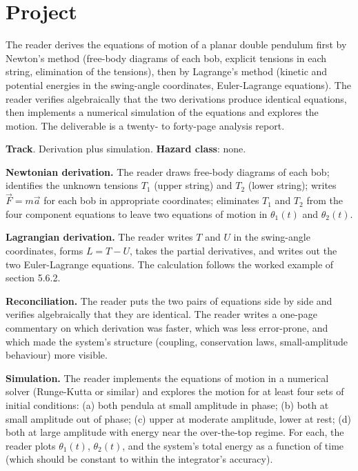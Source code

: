 \section{Project}

\begin{project}
The reader derives the equations of motion of a planar double
pendulum first by Newton's method (free-body diagrams of each bob,
explicit tensions in each string, elimination of the tensions),
then by Lagrange's method (kinetic and potential energies in the
swing-angle coordinates, Euler-Lagrange equations). The reader
verifies algebraically that the two derivations produce identical
equations, then implements a numerical simulation of the equations
and explores the motion. The deliverable is a twenty- to forty-page
analysis report.

\textbf{Track}. Derivation plus simulation. \textbf{Hazard class}:
none.

\textbf{Newtonian derivation.} The reader draws free-body diagrams of
each bob; identifies the unknown tensions $T_1$ (upper string) and
$T_2$ (lower string); writes $\vec{F} = m\vec{a}$ for each bob in
appropriate coordinates; eliminates $T_1$ and $T_2$ from the four
component equations to leave two equations of motion in $\theta_1
(t)$ and $\theta_2(t)$.

\textbf{Lagrangian derivation.} The reader writes $T$ and $U$ in the
swing-angle coordinates, forms $L = T - U$, takes the partial
derivatives, and writes out the two Euler-Lagrange equations. The
calculation follows the worked example of section 5.6.2.

\textbf{Reconciliation.} The reader puts the two pairs of equations
side by side and verifies algebraically that they are identical. The
reader writes a one-page commentary on which derivation was faster,
which was less error-prone, and which made the system's structure
(coupling, conservation laws, small-amplitude behaviour) more visible.

\textbf{Simulation.} The reader implements the equations of motion in
a numerical solver (Runge-Kutta or similar) and explores the motion
for at least four sets of initial conditions: (a) both pendula at
small amplitude in phase; (b) both at small amplitude out of phase;
(c) upper at moderate amplitude, lower at rest; (d) both at large
amplitude with energy near the over-the-top regime. For each, the
reader plots $\theta_1(t)$, $\theta_2(t)$, and the system's total
energy as a function of time (which should be constant to within
the integrator's accuracy).


\end{project}
